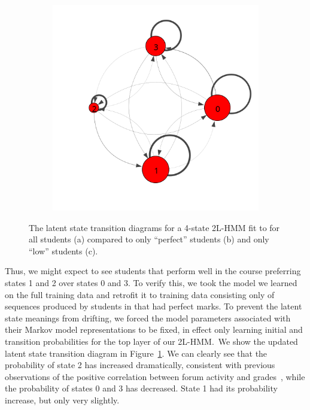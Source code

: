 \begin{figure}
\begin{subfigure}[t]{0.33\textwidth}
    \caption{\label{fig:trans-perfect}}
  \end{subfigure}%
  \begin{subfigure}[t]{0.33\textwidth}
    \includegraphics[width=\textwidth,trim={0, 3cm 0 2cm}]{figures/trans-comp/trans-low.png}
    \caption{\label{fig:trans-low}}
  \end{subfigure}
  \caption{The latent state transition diagrams for a 4-state 2L-HMM fit to
  \protect\textretrieval{} for all students (a) compared to only ``perfect''
  students (b) and only ``low'' students (c).}
  \label{fig:trans-comp}
\end{figure}

Thus, we might expect to see students that perform well in the course
preferring states 1 and 2 over states 0 and 3. To verify this, we took the
model we learned on the full training data and retrofit it to training data
consisting only of sequences produced by students in \textretrieval{} that
had perfect marks. To prevent the latent state meanings from drifting, we
forced the model parameters associated with their Markov model
representations to be fixed, in effect only learning initial and transition
probabilities for the top layer of our 2L-HMM.\ We show the updated latent
state transition diagram in Figure~\ref{fig:trans-perfect}. We can clearly
see that the probability of state 2 has increased dramatically, consistent
with previous observations of the positive correlation between forum activity and
grades~\cite{Huang:2014:LAS}, while the probability of states 0 and 3 has
decreased. State 1 had its probability increase, but only very slightly.

